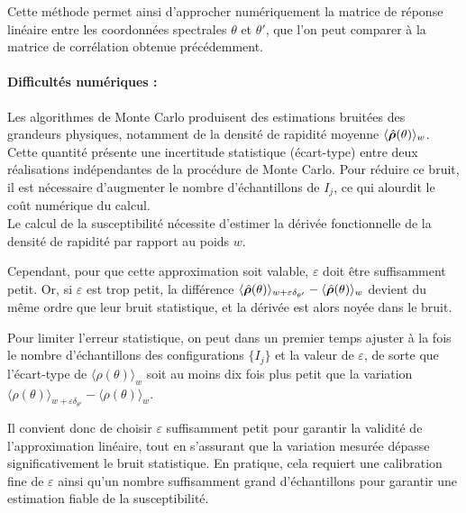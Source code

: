 Cette méthode permet ainsi d’approcher numériquement la matrice de réponse linéaire entre les coordonnées spectrales \( \theta \) et \( \theta' \), que l’on peut comparer à la matrice de corrélation obtenue précédemment.


\paragraph{Difficultés numériques :}

Les algorithmes de Monte Carlo produisent des estimations bruitées des grandeurs physiques, notamment de la densité de rapidité moyenne \( \langle \hat{\bm{\rho}}(\theta) \rangle_w \). Cette quantité présente une incertitude statistique (écart-type) entre deux réalisations indépendantes de la procédure de Monte Carlo. Pour réduire ce bruit, il est nécessaire d’augmenter le nombre d’échantillons de ${I_j}$, ce qui alourdit le coût numérique du calcul.\\

Le calcul de la susceptibilité nécessite d’estimer la dérivée fonctionnelle de la densité de rapidité par rapport au poids \( w \). 

Cependant, pour que cette approximation soit valable, \( \varepsilon \) doit être suffisamment petit. Or, si \( \varepsilon \) est trop petit, la différence  \( \langle \hat{\bm{\rho}}(\theta) \rangle_{w + \varepsilon \delta_{\theta'}} -  \langle\hat{\bm{\rho}} (\theta) \rangle_w \) devient du même ordre que leur bruit statistique, et la dérivée est alors noyée dans le bruit.

Pour limiter l'erreur statistique, on peut dans un premier temps ajuster à la fois le nombre d’échantillons des configurations \( \{I_j\} \) et la valeur de \( \varepsilon \), de sorte que l’écart-type de \( \langle \rho(\theta) \rangle_w \) soit au moins dix fois plus petit que la variation 
\(
\langle \rho(\theta) \rangle_{w + \varepsilon \delta_{\theta'}} - \langle \rho(\theta) \rangle_w.
\)

Il convient donc de choisir \( \varepsilon \) suffisamment petit pour garantir la validité de l'approximation linéaire, tout en s'assurant que la variation mesurée dépasse significativement le bruit statistique. En pratique, cela requiert une calibration fine de \( \varepsilon \) ainsi qu’un nombre suffisamment grand d’échantillons pour garantir une estimation fiable de la susceptibilité.


